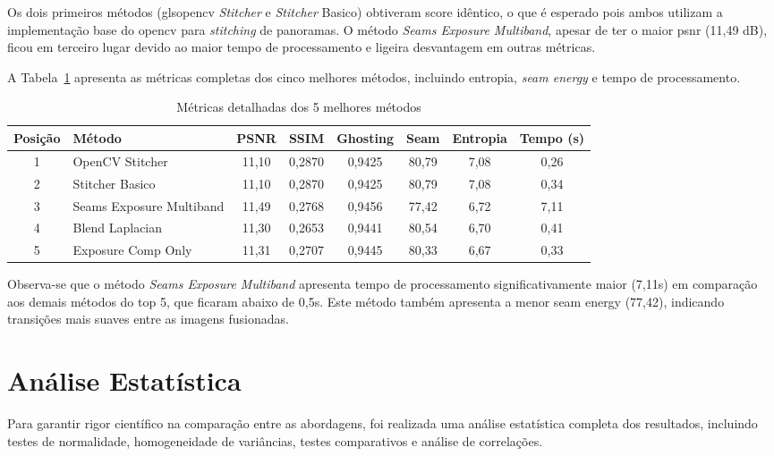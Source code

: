 Os dois primeiros métodos (gls{opencv} \textit{Stitcher} e \textit{Stitcher} Basico) obtiveram score idêntico, o que é esperado pois ambos utilizam a implementação base do \gls{opencv} para \textit{stitching} de panoramas. O método \textit{Seams Exposure Multiband}, apesar de ter o maior \gls{psnr} (11,49 dB), ficou em terceiro lugar devido ao maior tempo de processamento e ligeira desvantagem em outras métricas.

A Tabela~\ref{tab:top5-detalhado} apresenta as métricas completas dos cinco melhores métodos, incluindo entropia, \textit{seam energy} e tempo de processamento.

\begin{table}[htb]
\centering
\caption{Métricas detalhadas dos 5 melhores métodos}
\label{tab:top5-detalhado}
\tiny
\begin{tabular}{clcccccc}
\hline
\textbf{Posição} & \textbf{Método} & \textbf{PSNR} & \textbf{SSIM} & \textbf{Ghosting} & \textbf{Seam} & \textbf{Entropia} & \textbf{Tempo (s)} \\ \hline
1 & OpenCV Stitcher & 11,10 & 0,2870 & 0,9425 & 80,79 & 7,08 & 0,26 \\
2 & Stitcher Basico & 11,10 & 0,2870 & 0,9425 & 80,79 & 7,08 & 0,34 \\
3 & Seams Exposure Multiband & 11,49 & 0,2768 & 0,9456 & 77,42 & 6,72 & 7,11 \\
4 & Blend Laplacian & 11,30 & 0,2653 & 0,9441 & 80,54 & 6,70 & 0,41 \\
5 & Exposure Comp Only & 11,31 & 0,2707 & 0,9445 & 80,33 & 6,67 & 0,33 \\
\hline
\end{tabular}
\end{table}

Observa-se que o método \textit{Seams Exposure Multiband} apresenta tempo de processamento significativamente maior (7,11s) em comparação aos demais métodos do top 5, que ficaram abaixo de 0,5s. Este método também apresenta a menor seam energy (77,42), indicando transições mais suaves entre as imagens fusionadas.

\section{Análise Estatística}

Para garantir rigor científico na comparação entre as abordagens, foi realizada uma análise estatística completa dos resultados, incluindo testes de normalidade, homogeneidade de variâncias, testes comparativos e análise de correlações.

